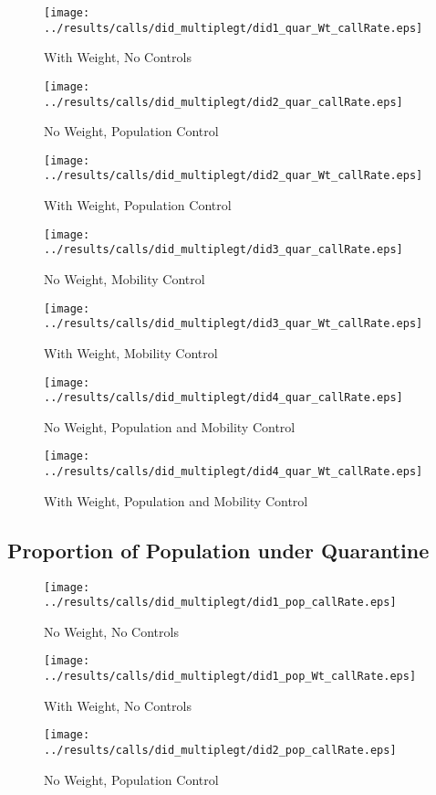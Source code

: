 \documentclass[11pt,letterpaper]{article}
\begin{document}
\begin{figure}[H]
\caption{With Weight, No Controls}
\centering
\texttt{[image: ../results/calls/did\_multiplegt/did1\_quar\_Wt\_callRate.eps]}
\end{figure}
\begin{figure}[H]
\caption{No Weight, Population Control}
\centering
\texttt{[image: ../results/calls/did\_multiplegt/did2\_quar\_callRate.eps]}
\end{figure}

\begin{figure}[H]
\caption{With Weight, Population Control}
\centering
\texttt{[image: ../results/calls/did\_multiplegt/did2\_quar\_Wt\_callRate.eps]}
\end{figure}
\begin{figure}[H]
\caption{No Weight, Mobility Control}
\centering
\texttt{[image: ../results/calls/did\_multiplegt/did3\_quar\_callRate.eps]}
\end{figure}

\begin{figure}[H]
\caption{With Weight, Mobility Control}
\centering
\texttt{[image: ../results/calls/did\_multiplegt/did3\_quar\_Wt\_callRate.eps]}
\end{figure}
\begin{figure}[H]
\caption{No Weight, Population and Mobility Control}
\centering
\texttt{[image: ../results/calls/did\_multiplegt/did4\_quar\_callRate.eps]}
\end{figure}

\begin{figure}[H]
\caption{With Weight, Population and Mobility Control}
\centering
\texttt{[image: ../results/calls/did\_multiplegt/did4\_quar\_Wt\_callRate.eps]}
\end{figure}

	\subsection{Proportion of Population under Quarantine}
\begin{figure}[H]
\caption{No Weight, No Controls}
\centering
\texttt{[image: ../results/calls/did\_multiplegt/did1\_pop\_callRate.eps]}
\end{figure}

\begin{figure}[H]
\caption{With Weight, No Controls}
\centering
\texttt{[image: ../results/calls/did\_multiplegt/did1\_pop\_Wt\_callRate.eps]}
\end{figure}
\begin{figure}[H]
\caption{No Weight, Population Control}
\centering
\texttt{[image: ../results/calls/did\_multiplegt/did2\_pop\_callRate.eps]}
\end{figure}
\end{document}
